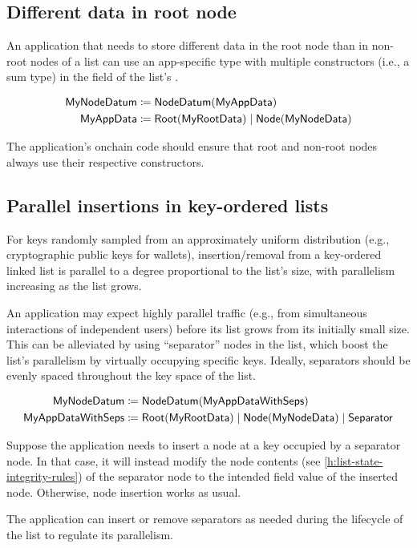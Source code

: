 \documentclass[../midgard.tex]{subfiles}
\begin{document}
\subsection{Different data in root node}
\label{h:list-different-data-in-root}

An application that needs to store different data in the root node than in non-root nodes of a list can use an app-specific type with multiple constructors (i.e., a sum type) in the  field of the list's .

\begin{align*}
    \mathsf{MyNodeDatum} &\coloneq \mathsf{NodeDatum} (\mathsf{MyAppData}) \\
    \mathsf{MyAppData} &\coloneq \mathsf{Root}(\mathsf{MyRootData}) \;|\; \mathsf{Node}(\mathsf{MyNodeData})
\end{align*}

The application's onchain code should ensure that root and non-root nodes always use their respective constructors.

\subsection{Parallel insertions in key-ordered lists}
\label{h:parallel-insertions-in-key-ordered-lists}

For keys randomly sampled from an approximately uniform distribution (e.g., cryptographic public keys for wallets), insertion/removal from a key-ordered linked list is parallel to a degree proportional to the list's size, with parallelism increasing as the list grows.

An application may expect highly parallel traffic (e.g., from simultaneous interactions of independent users) before its list grows from its initially small size.
This can be alleviated by using ``separator'' nodes in the list, which boost the list's parallelism by virtually occupying specific keys.
Ideally, separators should be evenly spaced throughout the key space of the list.

\begin{align*}
    \mathsf{MyNodeDatum} &\coloneq \mathsf{NodeDatum} (\mathsf{MyAppDataWithSeps}) \\
    \mathsf{MyAppDataWithSeps} &\coloneq \mathsf{Root}(\mathsf{MyRootData}) \;|\;
        \mathsf{Node}(\mathsf{MyNodeData}) \;|\;
        \mathsf{Separator}
\end{align*}

Suppose the application needs to insert a node at a key occupied by a separator node.
In that case, it will instead modify the node contents (see \cref{h:list-state-integrity-rules}) of the separator node to the intended  field value of the inserted node.
Otherwise, node insertion works as usual.

The application can insert or remove separators as needed during the lifecycle of the list to regulate its parallelism.
\end{document}
